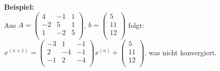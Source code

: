 \documentclass{scrartcl}
\begin{document}
\textbf{Beispiel:}\\
Aus $A=\begin{pmatrix}
4 & -1 & 1 \\
-2 & 5 & 1 \\
1 & -2 & 5 \\
\end{pmatrix}$, 
$b=\begin{pmatrix}
5\\
11 \\
12\\
\end{pmatrix}$ folgt:
$x^{(n+1)}=\begin{pmatrix}
-3 & 1 & -1 \\
2 & -4 & -1 \\
-1 & 2 & -4 \\
\end{pmatrix} x^{(n)}+
\begin{pmatrix}
5\\
11 \\
12\\
\end{pmatrix} $,
was nicht konvergiert.
\end{document}
